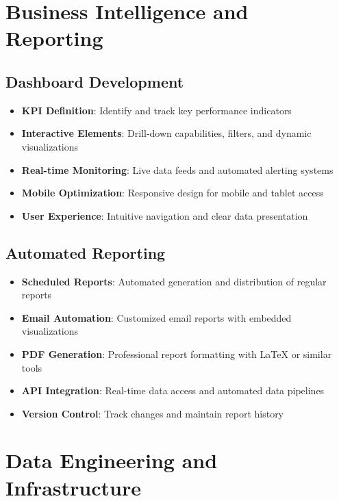 \documentclass[11pt,a4paper]{article}
\begin{document}
\section{Business Intelligence and Reporting}

\subsection{Dashboard Development}
\begin{itemize}[leftmargin=*]
    \item \textbf{KPI Definition}: Identify and track key performance indicators
    \item \textbf{Interactive Elements}: Drill-down capabilities, filters, and dynamic visualizations
    \item \textbf{Real-time Monitoring}: Live data feeds and automated alerting systems
    \item \textbf{Mobile Optimization}: Responsive design for mobile and tablet access
    \item \textbf{User Experience}: Intuitive navigation and clear data presentation
\end{itemize}

\subsection{Automated Reporting}
\begin{itemize}[leftmargin=*]
    \item \textbf{Scheduled Reports}: Automated generation and distribution of regular reports
    \item \textbf{Email Automation}: Customized email reports with embedded visualizations
    \item \textbf{PDF Generation}: Professional report formatting with LaTeX or similar tools
    \item \textbf{API Integration}: Real-time data access and automated data pipelines
    \item \textbf{Version Control}: Track changes and maintain report history
\end{itemize}

\section{Data Engineering and Infrastructure}
\end{document}

